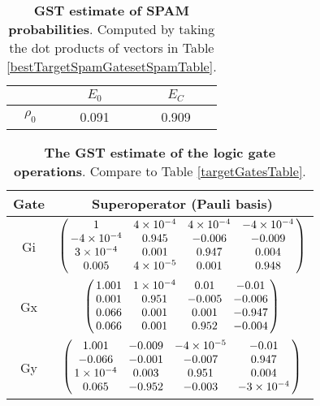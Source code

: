 {\begin{table}[h]
\begin{center}
\begin{tabular}[l]{|c|c|c|}
\hline
 & $E_{0}$ & $E_C$ \\ \hline
$\rho_{0}$ & 0.091 & 0.909 \\ \hline
\end{tabular}

\caption{\textbf{GST estimate of SPAM probabilities}.  Computed by taking the dot products of vectors in Table \ref{bestTargetSpamGatesetSpamTable}.\label{bestTargetSpamGatesetSpamParametersTable}}
\end{center}
\end{table}

\begin{table}[h]
\begin{center}
\begin{tabular}[l]{|c|c|}
\hline
Gate & Superoperator (Pauli basis) \\ \hline
Gi & $ \left(\!\!\begin{array}{cccc}
1 & 4\times 10^{-4} & 4\times 10^{-4} & -4\times 10^{-4} \\ 
-4\times 10^{-4} & 0.945 & -0.006 & -0.009 \\ 
3\times 10^{-4} & 0.001 & 0.947 & 0.004 \\ 
0.005 & 4\times 10^{-5} & 0.001 & 0.948
 \end{array}\!\!\right) $
 \\ \hline
Gx & $ \left(\!\!\begin{array}{cccc}
1.001 & 1\times 10^{-4} & 0.01 & -0.01 \\ 
0.001 & 0.951 & -0.005 & -0.006 \\ 
0.066 & 0.001 & 0.001 & -0.947 \\ 
0.066 & 0.001 & 0.952 & -0.004
 \end{array}\!\!\right) $
 \\ \hline
Gy & $ \left(\!\!\begin{array}{cccc}
1.001 & -0.009 & -4\times 10^{-5} & -0.01 \\ 
-0.066 & -0.001 & -0.007 & 0.947 \\ 
1\times 10^{-4} & 0.003 & 0.951 & 0.004 \\ 
0.065 & -0.952 & -0.003 & -3\times 10^{-4}
 \end{array}\!\!\right) $
 \\ \hline
\end{tabular}

\caption{\textbf{The GST estimate of the logic gate operations}.  Compare to Table \ref{targetGatesTable}.\label{bestTargetSpamGatesetGatesTable}}
\end{center}
\end{table}

}
